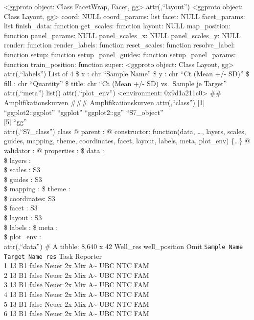 \documentclass[
]{article}
\begin{document}
\textless ggproto object: Class FacetWrap, Facet, gg\textgreater{}
attr(,``layout'') \textless ggproto object: Class Layout,
gg\textgreater{} coord: NULL coord\_params: list facet: NULL
facet\_params: list finish\_data: function get\_scales: function layout:
NULL map\_position: function panel\_params: NULL panel\_scales\_x: NULL
panel\_scales\_y: NULL render: function render\_labels: function
reset\_scales: function resolve\_label: function setup: function
setup\_panel\_guides: function setup\_panel\_params: function
train\_position: function super: \textless ggproto object: Class Layout,
gg\textgreater{} attr(,``labels'') List of 4 \$ x : chr ``Sample Name''
\$ y : chr ``Ct (Mean +/- SD)'' \$ fill : chr ``Quantity'' \$ title: chr
``Ct (Mean +/- SD) vs.~Sample je Target'' attr(,``meta'') list()
attr(,``plot\_env'') \textless environment: 0x9d1a211c0\textgreater{}
\n\#\# Amplifikationskurven \n\n\#\#\# Amplifikationskurven \n\n
attr(,``class'') {[}1{]} ``ggplot2::ggplot'' ``ggplot'' ``ggplot2::gg''
``S7\_object''\\
{[}5{]} ``gg''\\
attr(,``S7\_class'') class @ parent : @ constructor: function(data,
\ldots, layers, scales, guides, mapping, theme, coordinates, facet,
layout, labels, meta, plot\_env) \{\ldots\} @ validator : @ properties :
\$ data : \\
\$ layers : \\
\$ scales : S3\\
\$ guides : S3\\
\$ mapping : \$ theme : \\
\$ coordinates: S3\\
\$ facet : S3\\
\$ layout : S3\\
\$ labels : \$ meta : \\
\$ plot\_env : \\
attr(,``data'') \# A tibble: 8,640 x 42 Well\_res well\_position Omit
\texttt{Sample\ Name} \texttt{Target\ Name\_res} Task Reporter \\
1 13 B1 false Neuer 2x Mix A\textasciitilde{} UBC NTC FAM\\
2 13 B1 false Neuer 2x Mix A\textasciitilde{} UBC NTC FAM\\
3 13 B1 false Neuer 2x Mix A\textasciitilde{} UBC NTC FAM\\
4 13 B1 false Neuer 2x Mix A\textasciitilde{} UBC NTC FAM\\
5 13 B1 false Neuer 2x Mix A\textasciitilde{} UBC NTC FAM\\
6 13 B1 false Neuer 2x Mix A\textasciitilde{} UBC NTC FAM\\
\end{document}
